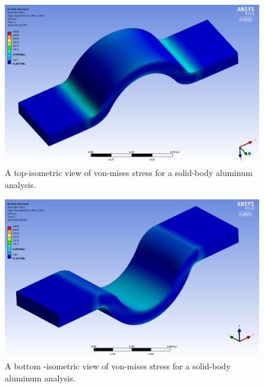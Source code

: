 

\begin{figure}[htp]
\centering
\includegraphics[width=1\textwidth]{./figures/fea/fea-solid-al-vms-top}
\caption{A top-isometric view of von-mises stress for a solid-body aluminum analysis.}
\label{fig:fea-solid-al-vms-top}
\end{figure}

\begin{figure}[htp]
\centering
\includegraphics[width=1\textwidth]{./figures/fea/fea-solid-al-vms-bottom}
\caption{A bottom -isometric view of von-mises stress for a solid-body aluminum analysis.}
\label{fig:fea-solid-al-vms-bottom}
\end{figure}


